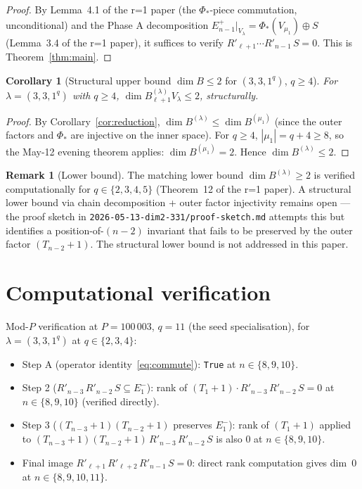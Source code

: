 \documentclass[11pt]{article}
\newtheorem{corollary}[theorem]{Corollary}
\theoremstyle{definition}
\newtheorem{remark}[theorem]{Remark}
\begin{document}
\begin{proof}
By Lemma~4.1 of the r=1 paper (the $\Phi_*$-piece commutation,
unconditional) and the Phase A decomposition
$E_{n-1}^+|_{V_\lambda} = \Phi_*(V_{\mu_1}) \oplus S$ (Lemma~3.4 of the
r=1 paper), it suffices to verify $R'_{\ell+1}\cdots R'_{n-1}\,S = 0$.
This is Theorem~\ref{thm:main}.
\end{proof}

\begin{corollary}[Structural upper bound $\dim B \le 2$ for $(3, 3, 1^q)$, $q \ge 4$]\label{cor:dim}
For $\lambda = (3, 3, 1^q)$ with $q \ge 4$,
$\dim B_{\ell+1}^{(\lambda)} V_\lambda \le 2$, structurally.
\end{corollary}

\begin{proof}
By Corollary~\ref{cor:reduction},
$\dim B^{(\lambda)} \le \dim B^{(\mu_1)}$ (since the outer factors and
$\Phi_*$ are injective on the inner space). For $q \ge 4$,
$|\mu_1| = q + 4 \ge 8$, so the May-12 evening theorem applies:
$\dim B^{(\mu_1)} = 2$. Hence $\dim B^{(\lambda)} \le 2$.
\end{proof}

\begin{remark}[Lower bound]
The matching lower bound $\dim B^{(\lambda)} \ge 2$ is verified
computationally for $q \in \{2, 3, 4, 5\}$ (Theorem~12 of the r=1
paper). A structural lower bound via chain decomposition + outer
factor injectivity remains open --- the proof sketch in
\texttt{2026-05-13-dim2-331/proof-sketch.md} attempts this but
identifies a position-of-$(n-2)$ invariant that fails to be
preserved by the outer factor $(T_{n-2}+1)$. The structural
lower bound is not addressed in this paper.
\end{remark}

\section{Computational verification}\label{sec:comp}

Mod-$P$ verification at $P = 100\,003$, $q = 11$ (the seed
specialisation), for $\lambda = (3, 3, 1^q)$ at $q \in \{2, 3, 4\}$:

\begin{itemize}[leftmargin=2em,topsep=0.3em,itemsep=0.2em]
\item Step A (operator identity~\eqref{eq:commute}): \texttt{True} at
$n \in \{8, 9, 10\}$.
\item Step 2 ($R'_{n-3}\,R'_{n-2}\,S \subseteq E_1^-$): rank of
$(T_1+1) \cdot R'_{n-3}\,R'_{n-2}\,S = 0$ at $n \in \{8, 9, 10\}$
(verified directly).
\item Step 3 ($(T_{n-3}+1)(T_{n-2}+1)$ preserves $E_1^-$): rank of
$(T_1+1)$ applied to $(T_{n-3}+1)(T_{n-2}+1)\,R'_{n-3}\,R'_{n-2}\,S$
is also $0$ at $n \in \{8, 9, 10\}$.
\item Final image $R'_{\ell+1}\,R'_{\ell+2}\,R'_{n-1}\,S = 0$:
direct rank computation gives dim~$0$ at $n \in \{8, 9, 10, 11\}$.
\end{itemize}
\end{document}
